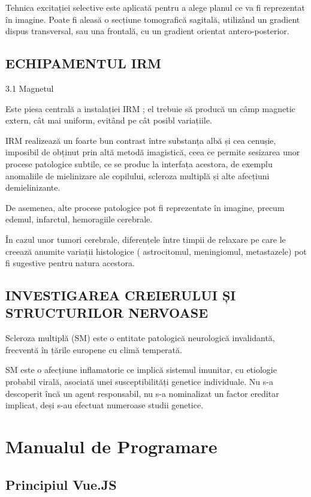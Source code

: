 \documentclass{article}
\begin{document}
Tehnica excitației selective este aplicată pentru a alege planul ce va fi reprezentat în imagine. Poate fi aleasă o secțiune tomografică sagitală, utilizând un gradient dispus transversal, sau una frontală, cu un gradient orientat antero-posterior.


\subsection{ECHIPAMENTUL IRM}

3.1 Magnetul 


Este piesa centrală a instalației IRM ; el trebuie să producă un câmp magnetic extern, cât mai uniform, evitând pe cât posibl variațiile.


IRM realizează un foarte bun contrast între substanța albă și cea cenușie, imposibil de obținut prin altă metodă imagistică, ceea ce permite sesizarea unor procese patologice subtile, ce se produc la interfața acestora, de exemplu anomaliile de mielinizare ale copilului, scleroza multiplă și alte afecțiuni demielinizante.

De asemenea, alte procese patologice pot fi reprezentate în imagine, precum edemul, infarctul, hemoragiile cerebrale.

În cazul unor tumori cerebrale, diferențele între timpii de relaxare pe care le creează anumite variații histologice ( astrocitomul, meningiomul, metastazele) pot fi sugestive pentru natura acestora.

\subsection{INVESTIGAREA CREIERULUI ȘI STRUCTURILOR NERVOASE }

Scleroza multiplă (SM) este o entitate patologică neurologică invalidantă, frecventă în țările europene cu climă temperată. 

SM este o afecțiune inflamatorie ce implică sistemul imunitar, cu etiologie probabil virală, asociată unei susceptibilități genetice individuale. Nu s-a descoperit încă un agent responsabil, nu s-a nominalizat un factor ereditar implicat, deși s-au efectuat numeroase studii genetice. 

\section{Manualul de Programare}

\subsection{Principiul Vue.JS}
\end{document}
